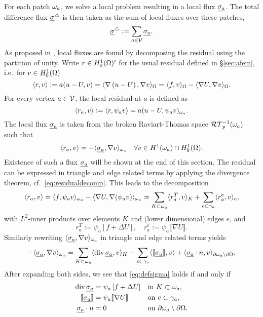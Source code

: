 \documentclass[thesis.tex]{subfiles}
\begin{document}
For each patch $\omega_a$, we solve a local problem resulting in a local flux $\underline{\sigma_a}$. 
The total difference flux $\underline{\sigma}^\triangle$ is then taken as the sum of local fluxes over these patches, 
\[
  \underline{\sigma}^\triangle := \sum_{a \in \mathcal{V}} \underline{\sigma_a}.
\] 
As proposed  in \cite{braessequilrobust}, local fluxes are found by decomposing the residual using the partition of unity. 
Write $r \in H_0^1(\Omega)'$ for the usual residual defined in \S\ref{sec:afem}, i.e.~for $v\in H_0^1(\Omega)$ 
\[
  \langle r,v \rangle := a(u - U, v) = \langle \nabla \left(u - U\right), \nabla v \rangle_\Omega = \langle f,v \rangle_\Omega - \langle \nabla U,\nabla v \rangle_\Omega.
\]
For every vertex $a \in \mathcal{V}$, the local residual at $a$ is defined as
\[
  \langle r_a,v \rangle := \langle r,\psi_a v \rangle = a(u - U, \psi_a v)_{\omega_a}.
\]
The local flux $\underline{\sigma_a}$ is taken from the broken Raviart-Thomas space $\mathcal{RT}_{p}^{-1}(\omega_a)$ such that
\begin{equation}
  \label{eq:defsigma}
  \langle r_a, v \rangle = - \langle \underline{\sigma_a}, \nabla v \rangle_{\omega_a} \quad \forall v \in H^1(\omega_a) \cap H_0^1(\Omega).
\end{equation}
Existence of such a flux $\underline{\sigma_a}$ will be shown at the end of this section.
The residual can be expressed in triangle and edge related terms by applying the divergence theorem, cf.~\eqref{eq:residualdecomp}.
This leads to the decomposition
\begin{equation}
  \label{eq:locdecomp}
  \langle r_a,v \rangle = \langle f, \psi_a v \rangle_{\omega_a} - \langle \nabla U, \nabla (\psi_av) \rangle_{\omega_a} = \sum_{ K\subset \omega_a} \langle{r^T_a, v}\rangle_K + \sum_{ e \subset \gamma_a} \langle r^e_a, v \rangle_e,
\end{equation}
with $L^2$-inner products over elements $K$ and (lower dimensional) edges $e$, and
\[
  r^T_a := \psi_a \left[ f + \Delta U \right], \quad r^e_a := \psi_a \llbracket \nabla U \rrbracket.
\]
Similarly rewriting $\langle \underline{\sigma_a}, \nabla v \rangle_{\omega_a}$ in triangle and edge related terms yields
\[
  -\langle \underline{\sigma_a}, \nabla v \rangle_{\omega_a} = \sum_{K \subset \omega_a} \langle \operatorname{div} \underline{\sigma_a}, v \rangle_K + \sum_{ e\subset \gamma_a} \langle \llbracket \underline{\sigma_a}\rrbracket, v \rangle + \langle \underline{\sigma_a}\cdot n, v \rangle_{\partial \omega_a \setminus \partial \Omega}.
\]
After expanding both sides, we see that \eqref{eq:defsigma} holds if and only if
\begin{equation}
  \label{eq:sigmacons}
  \begin{alignedat}{3}
    \operatorname{div} \underline{\sigma_a} &= \psi_a \left [f + \Delta U\right] && \quad\text{in }  K\subset \omega_a ,\\
    \llbracket \underline{\sigma_a} \rrbracket &= \psi_a \llbracket \nabla U \rrbracket && \quad \text{on } e \subset \gamma_a,\\
    \underline{\sigma_a} \cdot n &= 0 &&\quad \text{on } \partial \omega_a \setminus \partial \Omega.
  \end{alignedat}
\end{equation}
\end{document}
